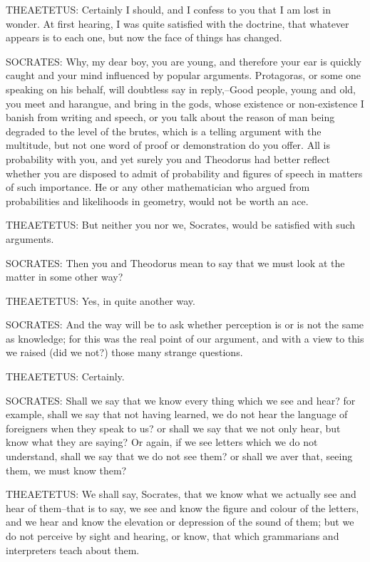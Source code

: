 THEAETETUS: Certainly I should, and I confess to you that I am lost in
wonder. At first hearing, I was quite satisfied with the doctrine, that
whatever appears is to each one, but now the face of things has changed.

SOCRATES: Why, my dear boy, you are young, and therefore your ear
is quickly caught and your mind influenced by popular arguments.
Protagoras, or some one speaking on his behalf, will doubtless say in
reply,--Good people, young and old, you meet and harangue, and bring
in the gods, whose existence or non-existence I banish from writing and
speech, or you talk about the reason of man being degraded to the level
of the brutes, which is a telling argument with the multitude, but not
one word of proof or demonstration do you offer. All is probability with
you, and yet surely you and Theodorus had better reflect whether you
are disposed to admit of probability and figures of speech in matters
of such importance. He or any other mathematician who argued from
probabilities and likelihoods in geometry, would not be worth an ace.

THEAETETUS: But neither you nor we, Socrates, would be satisfied with
such arguments.

SOCRATES: Then you and Theodorus mean to say that we must look at the
matter in some other way?

THEAETETUS: Yes, in quite another way.

SOCRATES: And the way will be to ask whether perception is or is not the
same as knowledge; for this was the real point of our argument, and with
a view to this we raised (did we not?) those many strange questions.

THEAETETUS: Certainly.

SOCRATES: Shall we say that we know every thing which we see and hear?
for example, shall we say that not having learned, we do not hear the
language of foreigners when they speak to us? or shall we say that
we not only hear, but know what they are saying? Or again, if we see
letters which we do not understand, shall we say that we do not see
them? or shall we aver that, seeing them, we must know them?

THEAETETUS: We shall say, Socrates, that we know what we actually see
and hear of them--that is to say, we see and know the figure and colour
of the letters, and we hear and know the elevation or depression of the
sound of them; but we do not perceive by sight and hearing, or know,
that which grammarians and interpreters teach about them.

